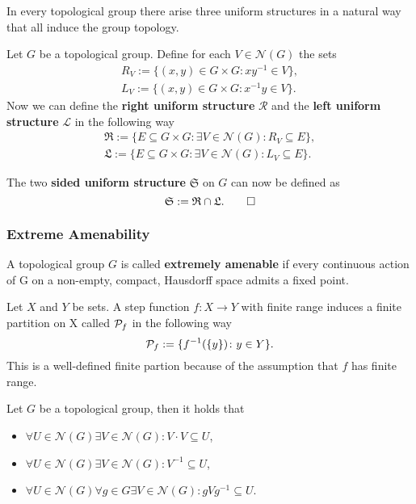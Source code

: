In every topological group there arise three uniform structures in a natural way that all induce the group topology.

\begin{defin}
  Let $G$ be a topological group. Define for each $V \in \mathcal{N}(G)$ the sets
  \begin{align*}
    R_V := \{(x, y) \in G\times G\colon xy^{-1} \in V\}, \\
    L_V := \{(x, y) \in G\times G\colon x^{-1}y \in V\}.
  \end{align*}
  Now we can define the \textbf{right uniform structure} $\mathcal{R}$ and the \textbf{left uniform structure} $\mathcal{L}$ in the following way
  \begin{align*}
    \mathfrak{R} := \{ E \subseteq G\times G \colon \exists V \in \mathcal{N}(G)\colon R_V \subseteq E \}, \\
    \mathfrak{L} := \{ E \subseteq G\times G \colon \exists V \in \mathcal{N}(G)\colon L_V \subseteq E \}.
  \end{align*}

  The two \textbf{sided uniform structure} $\mathfrak{S}$ on $G$ can now be defined as $$\mathfrak{S}:= \mathfrak{R} \cap \mathfrak{L}.\qedhere$$
\end{defin}

\subsubsection{Extreme Amenability}

\begin{defin}
  A topological group $G$ is called \textbf{extremely amenable} if every continuous action of G on a non-empty, compact, Hausdorff space admits a fixed point.
\end{defin}

\begin{defin}
  Let $X$ and $Y$ be sets. A step function $f\colon X \to Y$ with finite range induces a finite partition on X called $\P_f$ in the following way
  \begin{equation*}
    \P_f := \{f^{-1}(\{y\})\colon y \in Y\}.
  \end{equation*}
  This is a well-defined finite partion because of the assumption that $f$ has finite range.
\end{defin}

\begin{lemma}
  Let $G$ be a topological group, then it holds that
  \vspace*{-7px}
  \begin{itemize}
    \item $\forall U\in \mathcal{N}(G)\exists V\in\mathcal{N}(G)\colon V\cdot V \subseteq U$,
  \vspace*{-7px}
    \item $\forall U\in \mathcal{N}(G)\exists V\in\mathcal{N}(G)\colon V^{-1} \subseteq U$,
  \vspace*{-7px}
    \item $\forall U\in \mathcal{N}(G)\forall g\in G\exists V\in\mathcal{N}(G)\colon gVg^{-1} \subseteq U$.
  \end{itemize}
\end{lemma}

